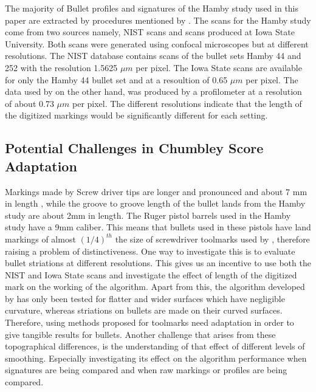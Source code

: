\documentclass[12pt]{article}
\begin{document}
The majority of Bullet profiles and signatures of the Hamby study
\citep{hamby} used in this paper are extracted by procedures mentioned
by \citet{aoas}. The scans for the Hamby study come from two sources
namely, NIST scans \citep{nist} and scans produced at Iowa State
University. Both scans were generated using confocal microscopes but at
different resolutions. The NIST database contains scans of the bullet
sets Hamby 44 and 252 with the resolution 1.5625 \(\mu m\) per pixel.
The Iowa State scans are available for only the Hamby 44 bullet set and
at a resoultion of 0.65 \(\mu m\) per pixel. The data used by
\citet{chumbley, hadler} on the other hand, was produced by a
profilometer at a resolution of about 0.73 \(\mu m\) per pixel. The
different resolutions indicate that the length of the digitized markings
would be significantly different for each setting.

\subsection{Potential Challenges in Chumbley Score
Adaptation}\label{potential-challenges-in-chumbley-score-adaptation}

Markings made by Screw driver tips \citep{chumbley} are longer and
pronounced and about 7 mm in length \citep{manytoolmarks1}, while the
groove to groove length of the bullet lands from the Hamby study
\citep{hamby} are about 2mm in length. The Ruger pistol barrels used in
the Hamby study have a 9mm caliber. This means that bullets used in
these pistols have land markings of almost \((1/4)^{th}\) the size of
screwdriver toolmarks used by \citet{chumbley, hadler}, therefore
raising a problem of distinctiveness. One way to investigate this is to
evaluate bullet striations at different resolutions. This gives us an
incentive to use both the NIST and Iowa State scans and investigate the
effect of length of the digitized mark on the working of the algorithm.
Apart from this, the algorithm developed by \citet{hadler} has only been
tested for flatter and wider surfaces which have negligible curvature,
whereas striations on bullets are made on their curved surfaces.
Therefore, using methods proposed for toolmarks need adaptation in order
to give tangible results for bullets. Another challenge that arises from
these topographical differences, is the understanding of that effect of
different levels of smoothing. Especially investigating its effect on
the algorithm performance when signatures are being compared and when
raw markings or profiles are being compared.
\end{document}
